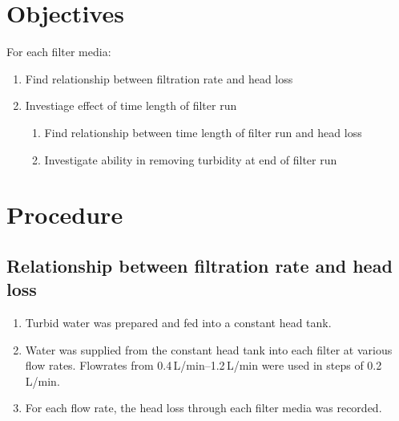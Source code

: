 \documentclass{article}
\begin{document}
\section{Objectives}
For each filter media:
\begin{enumerate}
\item Find relationship between filtration rate and head loss
\item Investiage effect of time length of filter run
  \begin{enumerate}
  \item Find relationship between time length of filter run and head loss
  \item Investigate ability in removing turbidity at end of filter run
  \end{enumerate}
\end{enumerate}



\section{Procedure}
\subsection{Relationship between filtration rate and head loss}
\begin{enumerate}
\item Turbid water was prepared and fed into a constant head tank.
\item Water was supplied from the constant head tank into each filter at 
      various flow rates. Flowrates from 0.4\,L/min\nobreakdash--1.2\,L/min 
      were used in steps of 0.2\,L/min.
\item For each flow rate, the head loss through each filter media was recorded.
\end{enumerate}
\end{document}
